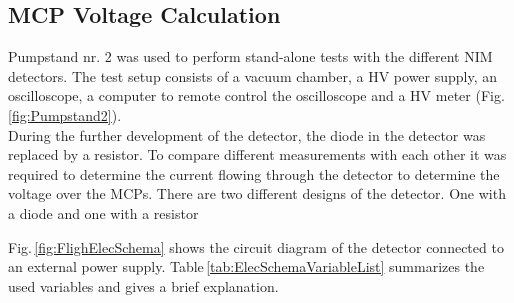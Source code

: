 		
		
		
		
		
		
		\subsection{MCP Voltage Calculation}\label{subsec:MCPVoltCalc} %
		
		Pumpstand nr. 2 was used to perform stand-alone tests with the different NIM detectors. The test setup consists of a vacuum chamber, a HV power supply, an oscilloscope, a computer to remote control the oscilloscope and a HV meter (Fig. \ref{fig:Pumpstand2}).\\
		
		During the further development of the detector, the diode in the detector was replaced by a resistor. To compare different measurements with each other it was required to determine the current flowing through the detector to determine the voltage over the MCPs.
		There are two different designs of the detector. One with a diode and one with a resistor
		
		Fig.\,\ref{fig:FlighElecSchema} shows the circuit diagram of the detector connected to an external power supply. Table\,\ref{tab:ElecSchemaVariableList} summarizes the used variables and gives a brief explanation.
		
